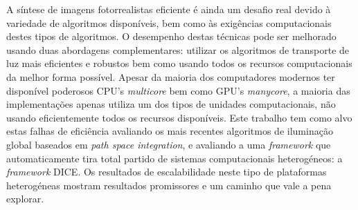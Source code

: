 A síntese de imagens fotorrealistas eficiente é ainda um desafio real devido à variedade de algoritmos disponíveis, bem como às exigências computacionais destes tipos de algoritmos. O desempenho destas técnicas pode ser melhorado usando duas abordagens complementares: utilizar os algoritmos de transporte de luz mais eficientes e robustos bem como usando todos os recursos computacionais da melhor forma possível. Apesar da maioria dos computadores modernos ter disponível poderosos CPU's \textit{multicore} bem como GPU's \textit{manycore}, a maioria das implementações apenas utiliza um dos tipos de unidades computacionais, não usando eficientemente todos os recursos disponíveis. Este trabalho tem como alvo estas falhas de eficiência avaliando os mais recentes algoritmos de iluminação global baseados em \textit{path space integration}, e avaliando a uma \textit{framework} que automaticamente tira total partido de sistemas computacionais heterogéneos: a \textit{framework} DICE. Os resultados de escalabilidade neste tipo de plataformas heterogéneas mostram resultados promissores e um caminho que vale a pena explorar.
